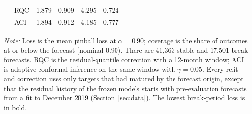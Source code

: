 \begin{table}[t]
\begin{tabular*}{\textwidth}{@{\extracolsep\fill}llrrrr@{}}
 & RQC & 1.879 & 0.909 & 4.295 & 0.724 \\
 & ACI & 1.894 & 0.912 & 4.185 & 0.777 \\
\bottomrule
\end{tabular*}
\begin{tablenotes}
\item \textit{Note:} Loss is the mean pinball loss at $\alpha=0.90$; coverage is the share of outcomes at or below the forecast (nominal 0.90). There are 41,363 stable and 17,501 break forecasts. RQC is the residual-quantile correction with a 12-month window; ACI is adaptive conformal inference on the same window with $\gamma=0.05$. Every refit and correction uses only targets that had matured by the forecast origin, except that the residual history of the frozen models starts with pre-evaluation forecasts from a fit to December 2019 (Section~\ref{sec:data}). The lowest break-period loss is in bold.
\end{tablenotes}
\end{table}
